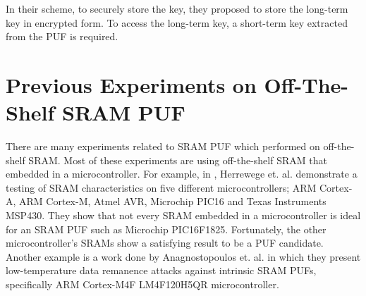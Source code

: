 In their scheme, to securely store the key, they proposed to store the long-term key in encrypted form. To access the long-term key, a short-term key extracted from the PUF is required.

\section{Previous Experiments on Off-The-Shelf SRAM PUF}\label{ch:prev_experiments}
There are many experiments related to SRAM PUF which performed on off-the-shelf SRAM. Most of these experiments are using off-the-shelf SRAM that embedded in a microcontroller. For example, in \cite{VanHerrewege:2013:DIP:2541806.2512493}, Herrewege et. al. demonstrate a testing of SRAM characteristics on five different microcontrollers; ARM Cortex-A, ARM Cortex-M, Atmel AVR, Microchip PIC16 and Texas Instruments MSP430. They show that not every SRAM embedded in a microcontroller is ideal for an SRAM PUF such as Microchip PIC16F1825. Fortunately, the other microcontroller's SRAMs show a satisfying result to be a PUF candidate.
Another example is a work done by Anagnostopoulos et. al. \cite{cryptoeprint:2016:769} in which they present low-temperature data remanence attacks against intrinsic SRAM PUFs, specifically ARM Cortex-M4F LM4F120H5QR microcontroller.

